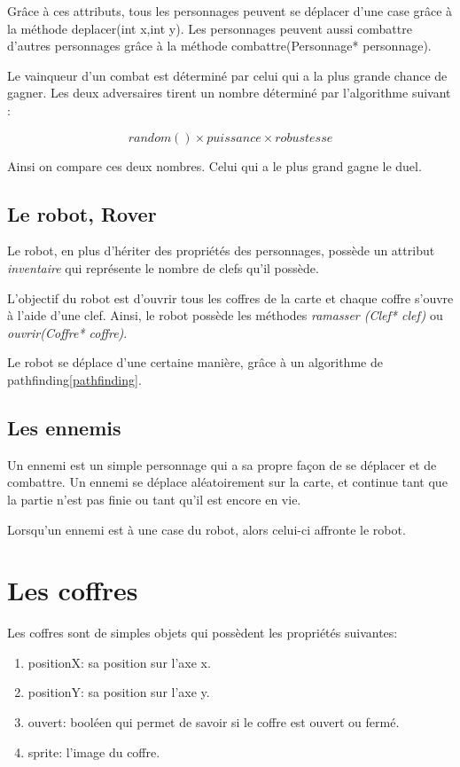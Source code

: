 \documentclass[a4paper 12pts]{article}
\begin{document}
Grâce à ces attributs, tous les personnages peuvent se déplacer d'une case grâce à la méthode deplacer(int x,int y). Les personnages peuvent aussi combattre d'autres personnages grâce à la méthode combattre(Personnage* personnage).

Le vainqueur d'un combat est déterminé par celui qui a la plus grande chance de gagner. Les deux adversaires tirent un nombre déterminé par l'algorithme suivant :

\begin{equation}
    random() \times puissance \times robustesse 
    \label{combat}
\end{equation}

Ainsi on compare ces deux nombres. Celui qui a le plus grand gagne le duel.

\subsection{Le robot, Rover}

Le robot, en plus d'hériter des propriétés des personnages, possède un attribut \emph{inventaire} qui représente le nombre de clefs qu'il possède.

L'objectif du robot est d'ouvrir tous les coffres de la carte et chaque coffre s'ouvre à l'aide d'une clef. Ainsi, le robot possède les méthodes \emph{ramasser
(Clef* clef)} ou \emph{ouvrir(Coffre* coffre)}.

Le robot se déplace d'une certaine manière, grâce à un algorithme de pathfinding\ref{pathfinding}.

\subsection{Les ennemis}

Un ennemi est un simple personnage qui a sa propre façon de se déplacer et de combattre. 
Un ennemi se déplace aléatoirement sur la carte, et continue tant que la partie n'est pas finie ou tant qu'il est encore en vie.

Lorsqu'un ennemi est à une case du robot, alors celui-ci affronte le robot.


\section{Les coffres}

Les coffres sont de simples objets qui possèdent les propriétés suivantes: 

\begin{enumerate}
	\item positionX: sa position sur l'axe x.
	\item positionY: sa position sur l'axe y. 
	\item ouvert: booléen qui permet de savoir si le coffre est ouvert ou fermé.
	\item sprite: l'image du coffre.
\end{enumerate}
\end{document}

